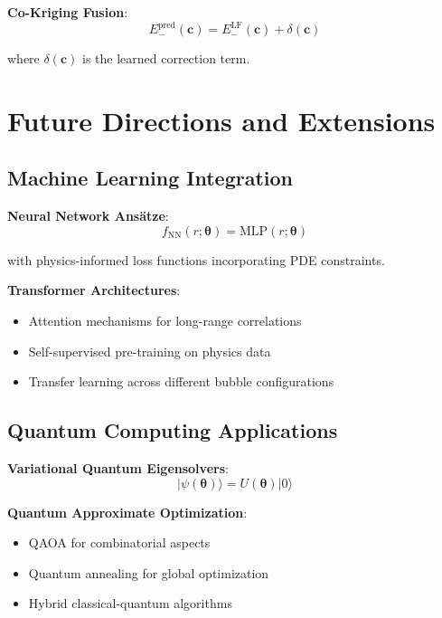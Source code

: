 \documentclass[11pt,a4paper]{article}
\begin{document}
\textbf{Co-Kriging Fusion}:
\begin{equation}
E_-^{\text{pred}}(\mathbf{c}) = E_-^{\text{LF}}(\mathbf{c}) + \delta(\mathbf{c})
\end{equation}

where $\delta(\mathbf{c})$ is the learned correction term.

\section{Future Directions and Extensions}

\subsection{Machine Learning Integration}

\textbf{Neural Network Ansätze}:
\begin{equation}
f_{\text{NN}}(r; \boldsymbol{\theta}) = \text{MLP}(r; \boldsymbol{\theta})
\end{equation}

with physics-informed loss functions incorporating PDE constraints.

\textbf{Transformer Architectures}:
\begin{itemize}
\item Attention mechanisms for long-range correlations
\item Self-supervised pre-training on physics data
\item Transfer learning across different bubble configurations
\end{itemize}

\subsection{Quantum Computing Applications}

\textbf{Variational Quantum Eigensolvers}:
\begin{equation}
|\psi(\boldsymbol{\theta})\rangle = U(\boldsymbol{\theta}) |0\rangle
\end{equation}

\textbf{Quantum Approximate Optimization}:
\begin{itemize}
\item QAOA for combinatorial aspects
\item Quantum annealing for global optimization
\item Hybrid classical-quantum algorithms
\end{itemize}
\end{document}
